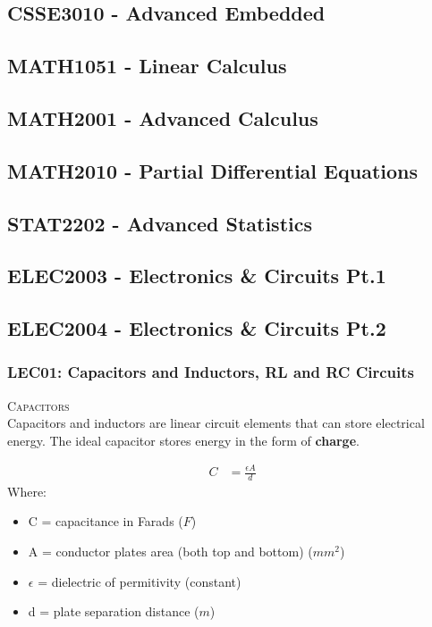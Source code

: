 \subsection{CSSE3010 - Advanced Embedded}
\clearpage

\subsection{MATH1051 - Linear Calculus}
\clearpage

\subsection{MATH2001 - Advanced Calculus}
\clearpage

\subsection{MATH2010 - Partial Differential Equations}
\clearpage

\subsection{STAT2202 - Advanced Statistics}
\clearpage

\subsection{ELEC2003 - Electronics \& Circuits Pt.1}
\clearpage

\subsection{ELEC2004 - Electronics \& Circuits Pt.2}
\subsubsection{LEC01: Capacitors and Inductors, RL and RC Circuits}
\textsc{\large Capacitors}\\
Capacitors and inductors are linear circuit elements that can store electrical energy. The ideal capacitor stores energy in the form of \textbf{charge}.

\begin{align} \label{eq_ELEC2004_capacitance}
  C &= \frac{\epsilon A}{d}
\end{align}
Where:
\begin{itemize}
  \item C = capacitance in Farads ($F$)
  \item A = conductor plates area (both top and bottom) ($mm^2$)
  \item $\epsilon$ = dielectric of permitivity (constant)
  \item d = plate separation distance ($m$)
\end{itemize}

